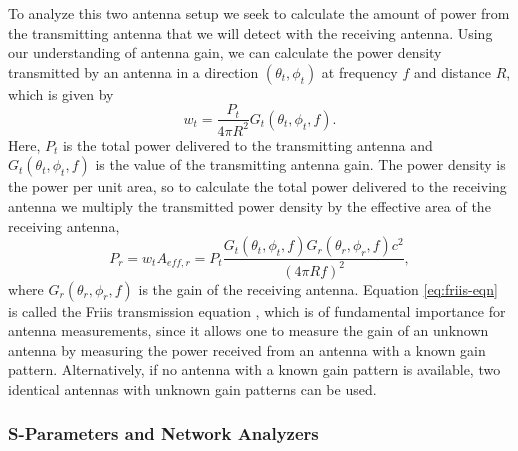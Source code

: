 To analyze this two antenna setup we seek to calculate the amount of power from the transmitting antenna that we will detect with the receiving antenna. Using our understanding of antenna gain, we can calculate the power density transmitted by an antenna in a direction $(\theta_t,\phi_t)$ at frequency $f$ and distance $R$, which is given by
\begin{equation}
    w_t = \frac{P_t}{4\pi R^2}G_t(\theta_t,\phi_t,f).
\end{equation}
Here, $P_t$ is the total power delivered to the transmitting antenna and $G_t(\theta_t,\phi_t,f)$ is the value of the transmitting antenna gain. The power density is the power per unit area, so to calculate the total power delivered to the receiving antenna we multiply the transmitted power density by the effective area of the receiving antenna,
\begin{equation}
    P_r = w_tA_{eff,r}=P_t\frac{G_t(\theta_t,\phi_t,f)G_r(\theta_r,\phi_r,f)c^2}{(4\pi Rf)^2},
    \label{eq:friis-eqn}
\end{equation}
where $G_r(\theta_r,\phi_r,f)$ is the gain of the receiving antenna. Equation \ref{eq:friis-eqn} is called the Friis transmission equation \cite{friis_paper}, which is of fundamental importance for antenna measurements, since it allows one to measure the gain of an unknown antenna by measuring the power received from an antenna with a known gain pattern. Alternatively, if no antenna with a known gain pattern is available, two identical antennas with unknown gain patterns can be used.

\subsubsection{S-Parameters and Network Analyzers}

